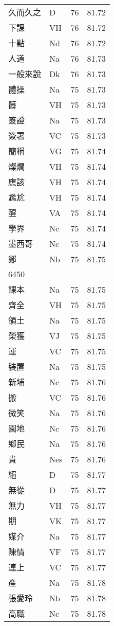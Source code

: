 \documentclass[twocolumn]{book}
\begin{document}
\begin{supertabular}{llrr}
久而久之 & D & 76 &  81.72\\
下課 & VH & 76 &  81.72\\
十點 & Nd & 76 &  81.72\\
人道 & Na & 76 &  81.73\\
一般來說 & Dk & 76 &  81.73\\
體操 & Na & 75 &  81.73\\
髒 & VH & 75 &  81.73\\
簽證 & Na & 75 &  81.73\\
簽署 & VC & 75 &  81.73\\
簡稱 & VG & 75 &  81.74\\
燦爛 & VH & 75 &  81.74\\
應該 & VH & 75 &  81.74\\
尷尬 & VH & 75 &  81.74\\
醒 & VA & 75 &  81.74\\
學界 & Nc & 75 &  81.74\\
墨西哥 & Nc & 75 &  81.74\\
鄭 & Nb & 75 &  81.75\\
6450\\
課本 & Na & 75 &  81.75\\
齊全 & VH & 75 &  81.75\\
領土 & Na & 75 &  81.75\\
榮獲 & VJ & 75 &  81.75\\
運 & VC & 75 &  81.75\\
裝置 & Na & 75 &  81.75\\
新埔 & Nc & 75 &  81.76\\
搬 & VC & 75 &  81.76\\
微笑 & Na & 75 &  81.76\\
園地 & Nc & 75 &  81.76\\
鄉民 & Na & 75 &  81.76\\
貴 & Nes & 75 &  81.76\\
絕 & D & 75 &  81.77\\
無從 & D & 75 &  81.77\\
無力 & VH & 75 &  81.77\\
期 & VK & 75 &  81.77\\
媒介 & Na & 75 &  81.77\\
陳情 & VF & 75 &  81.77\\
連上 & VC & 75 &  81.77\\
產 & Na & 75 &  81.78\\
張愛玲 & Nb & 75 &  81.78\\
高職 & Nc & 75 &  81.78\\

\end{supertabular}
\end{document}

